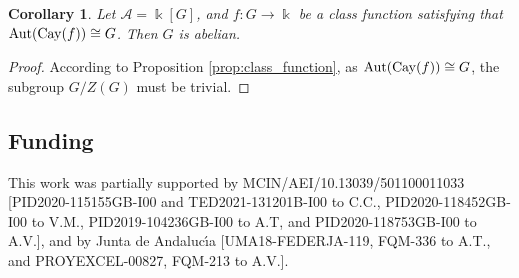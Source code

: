 \documentclass[a4paper,12pt]{amsart}
\newtheorem{corollary}[theorem]{Corollary}
\theoremstyle{definition}
\theoremstyle{remark}
\newcommand{\Aut}{\operatorname{Aut}}
\newcommand{\Cay}{{\rm Cay}}
\newcommand{\A}{\mathcal{A}}
\begin{document}
\begin{corollary}
Let $\A=\Bbbk[G]$, and $f\colon G\to \Bbbk$ be a class function satisfying that $\Aut(\Cay(f))\cong G$. Then $G$ is abelian.
\end{corollary}

\begin{proof}
According to Proposition \ref{prop:class_function}, as $\Aut(\Cay(f))\cong G$, the subgroup $G/Z(G)$ must be trivial.



\end{proof}

\subsection*{Funding}

\small{This work was partially supported by MCIN/AEI/10.13039/501100011033 
[PID2020-115155GB-I00 and TED2021-131201B-I00 to C.C., PID2020-118452GB-I00 to V.M., %
PID2019-104236GB-I00 to A.T, and PID2020-118753GB-I00 to A.V.], 
and by Junta de Andaluc\'{\i}a [UMA18-FEDERJA-119,  FQM-336  to A.T., and PROYEXCEL-00827, FQM-213 to A.V.].}






\end{document}
